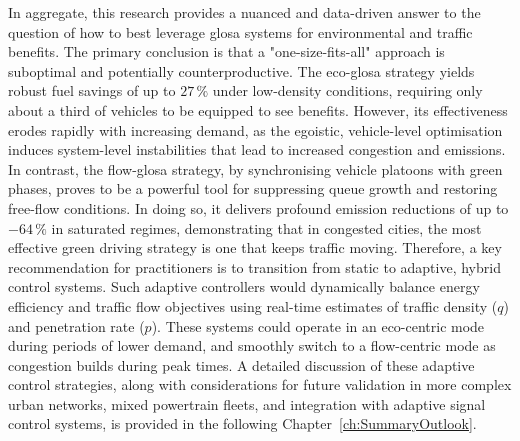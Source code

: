 In aggregate, this research provides a nuanced and data-driven answer to the question of how to best leverage \ac{glosa} systems for environmental and traffic benefits. The primary conclusion is that a "one-size-fits-all" approach is suboptimal and potentially counterproductive.
\mynewline
The \ac{eco-glosa} strategy yields robust fuel savings of up to $27\,\%$ under low-density conditions, requiring only about a third of vehicles to be equipped to see benefits. However, its effectiveness erodes rapidly with increasing demand, as the egoistic, vehicle-level optimisation induces system-level instabilities that lead to increased congestion and emissions. In contrast, the \ac{flow-glosa} strategy, by synchronising vehicle platoons with green phases, proves to be a powerful tool for suppressing queue growth and restoring free-flow conditions. In doing so, it delivers profound emission reductions of up to $-64\,\%$ in saturated regimes, demonstrating that in congested cities, the most effective green driving strategy is one that keeps traffic moving.
\mynewline
Therefore, a key recommendation for practitioners is to transition from static to adaptive, hybrid control systems. Such adaptive controllers would dynamically balance energy efficiency and traffic flow objectives using real-time estimates of traffic density ($q$) and penetration rate ($p$). These systems could operate in an eco-centric mode during periods of lower demand, and smoothly switch to a flow-centric mode as congestion builds during peak times. A detailed discussion of these adaptive control strategies, along with considerations for future validation in more complex urban networks, mixed powertrain fleets, and integration with adaptive signal control systems, is provided in the following Chapter~\ref{ch:SummaryOutlook}.

